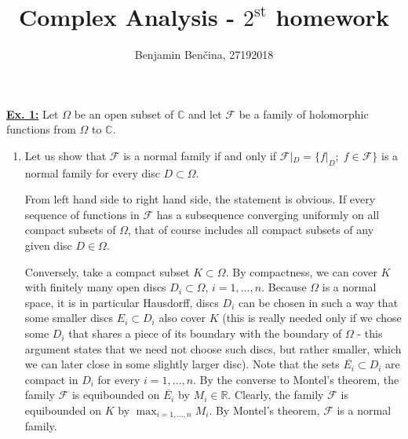 \documentclass[a4paper, 12pt]{article} %
\title{Complex Analysis - $2^{\text{st}}$ homework}
\author{Benjamin Benčina, 27192018}
\newcommand{\N}{\mathbb{N}}
\newcommand{\R}{\mathbb{R}}
\newcommand{\C}{\mathbb{C}}
\newcommand{\closure}[1]{\overline{#1}}
\begin{document}
\maketitle

\underline{\textbf{Ex. 1:}}
Let $\Omega$ be an open subset of $\C$ and let $\mathcal{F}$ be a family of holomorphic functions from $\Omega$ to $\C$.

\begin{enumerate}[label=(\alph*)]
	\item Let us show that $\mathcal{F}$ is a normal family if and only if $\mathcal{F}|_D = \lbrace f|_D ; \; f \in \mathcal{F} \rbrace$ is a normal family for every disc $D \subset \Omega$.
	
	From left hand side to right hand side, the statement is obvious. If every sequence of functions in $\mathcal{F}$ has a subsequence converging uniformly on all compact subsets of $\Omega$, that of course includes all compact subsets of any given disc $D \in \Omega$.
	
	Conversely, take a compact subset $K \subset \Omega$. By compactness, we can cover $K$ with finitely many open discs $D_i \subset \Omega$, $i = 1,\dots, n$.
	Because $\Omega$ is a normal space, it is in particular Hausdorff, discs $D_i$ can be chosen in such a way that some smaller discs $E_i \subset D_i$ also cover $K$ (this is really needed only if we chose some $D_i$ that shares a piece of its boundary with the boundary of $\Omega$ - this argument states that we need not choose such discs, but rather smaller, which we can later close in some slightly larger disc). Note that the sets $\closure{E_i} \subset D_i$ are compact in $D_i$ for every $i=1,\dots,n$. By the converse to Montel's theorem, the family $\mathcal{F}$ is equibounded on $\closure{E_i}$ by $M_i \in \R$. Clearly, the family $\mathcal{F}$ is equibounded on $K$ by $\max_{i=1,\dots,n}M_i$. By Montel's theorem, $\mathcal{F}$ is a normal family.
	

\end{enumerate}
\end{document}
